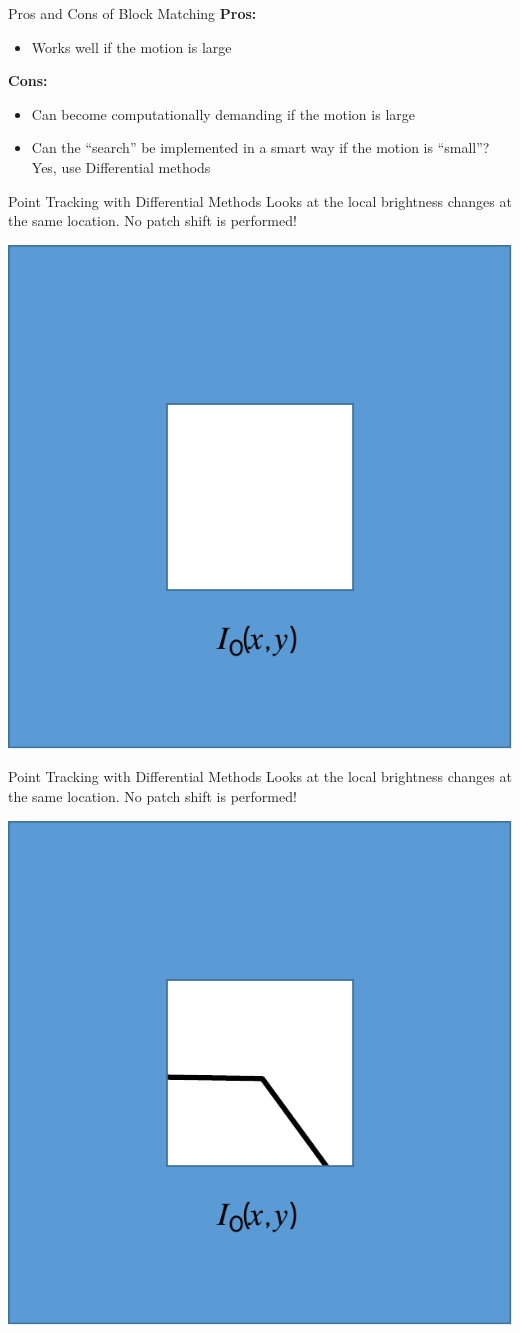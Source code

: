 \begin{frame}{Pros and Cons of Block Matching}
  \textbf{Pros:}
  \begin{itemize}
    \item Works well if the motion is large
  \end{itemize}
  
  \textbf{Cons:}
  \begin{itemize}
    \item Can become computationally demanding if the motion is large
    \item Can the “search” be implemented in a smart way if the motion is “small”?  
      Yes, use Differential methods
  \end{itemize}
\end{frame}

\begin{frame}{Point Tracking with Differential Methods}
  Looks at the local brightness changes at the same location. No patch shift is performed!
  
  \begin{center}
    \includegraphics[width=0.3\columnwidth]{./images/optical_flow/point_tracking_differential_methods_1.pdf}
  \end{center}
\end{frame}

\begin{frame}{Point Tracking with Differential Methods}
  Looks at the local brightness changes at the same location. No patch shift is performed!
  
  \begin{center}
    \includegraphics[width=0.3\columnwidth]{./images/optical_flow/point_tracking_differential_methods_2.pdf}
  \end{center}
\end{frame}

